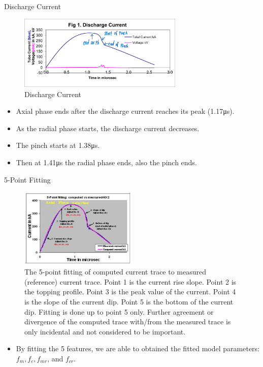 \begin{frame} {Discharge Current}
    \begin{figure}
        \centering
        \includegraphics[width=0.7\textwidth]{figures/figure1.png}
        \caption{Discharge Current}
        \label{fig:discharge-Current}
    \end{figure}
    \begin{itemize}
        \item Axial phase ends after the discharge current reaches its peak (1.17\unit{\micro\s}).
        \item As the radial phase starts, the discharge current decreases.
        \item The pinch starts at 1.38\unit{\micro\s}.
        \item Then at 1.41\unit{\micro\s} the radial phase ends, also the pinch ends.
    \end{itemize}
\end{frame}

\begin{frame} {5-Point Fitting}
    \begin{figure}
        \centering
        \includegraphics[width=0.5\textwidth]{figures/5-point-fitting.png}
        \caption{\scriptsize The 5-point fitting of computed current trace to measured (reference) current trace. Point 1 is the current rise slope. Point 2 is the topping profile. Point 3 is the peak value of the current. Point 4 is the slope of the current dip. Point 5 is the bottom of the current dip. Fitting is done up to point 5 only. Further agreement or divergence of the computed trace with/from the measured trace is only incidental and not considered to be important.}
        \label{fig:5-point-fitting}
    \end{figure}
    \begin{itemize}
        \item By fitting the 5 features, we are able to obtained the fitted model parameters: $f_m, f_c, f_{mr}$, and $f_{cr}$.
    \end{itemize}
\end{frame}

